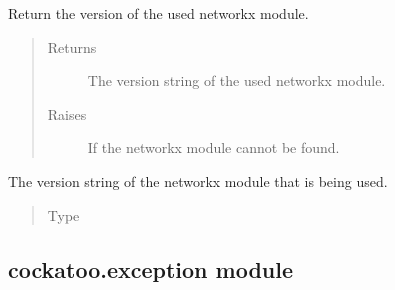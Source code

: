\documentclass[letterpaper,10pt,english]{sphinxmanual}
\begin{document}
\begin{fulllineitems}
\label{\detokenize{cockatoo:cockatoo.environment.networkx_version}}
Return the version of the used networkx module.
\begin{quote}\begin{description}
\item[{Returns}] \leavevmode
{} \textendash{} The version string of the used networkx module.

\item[{Raises}] \leavevmode
{\hyperref[\detokenize{cockatoo:cockatoo.exception.NetworkXNotPresentError}]{}} \textendash{} If the networkx module cannot be found.

\end{description}\end{quote}

\end{fulllineitems}


\begin{fulllineitems}
\label{\detokenize{cockatoo:cockatoo.environment.NXVERSION}}
The version string of the networkx module that is being used.
\begin{quote}\begin{description}
\item[{Type}] \leavevmode
{}

\end{description}\end{quote}

\end{fulllineitems}



\subsection{cockatoo.exception module}
\label{\detokenize{cockatoo:module-cockatoo.exception}}\label{\detokenize{cockatoo:cockatoo-exception-module}}
\end{document}
